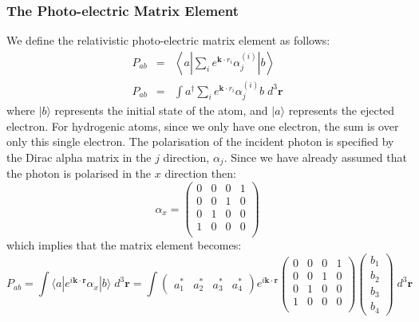 \documentclass[a4paper,titlepage]{report}
\newcommand{\mb}[1]{\mathbf{#1}}
\newcommand{\ket}[1]{|#1 \rangle}
\newcommand{\bra}[1]{\langle #1|}
\begin{document}
	\subsubsection{The Photo-electric Matrix Element}
	We define the relativistic photo-electric matrix element as follows:
	\begin{eqnarray}
		P_{ab} & = & \left\langle a \left|
						\sum_i e^{\mb{k}\cdot r_i} \alpha_j^{(i)} 
					\right| b \right\rangle \\
		P_{ab} & = & \int a^{\dagger}
						\sum_i e^{\mb{k}\cdot r_i} \alpha_j^{(i)} 
					b  \; d^3\mb{r}
	\end{eqnarray}
	where $\ket{b}$ represents the initial state of the atom, and $\ket{a}$
	represents the ejected electron. For hydrogenic atoms, since we only have
	one electron, the sum is over only this single electron. The polarisation of
	the incident photon is specified by the Dirac alpha matrix in the $j$
	direction, $\alpha_j$. Since we have already assumed that the photon is
	polarised in the $x$ direction then:
	\begin{equation*}
		\alpha_x = 
		\left(
			\begin{array}{cccc}
				0 & 0 & 0 & 1	\\
				0 & 0 & 1 & 0 	\\
				0 & 1 & 0 & 0	\\
				1 & 0 & 0 & 0 	\\
			\end{array}
		\right)
	\end{equation*}
	which implies that the matrix element becomes:
	\begin{equation*}
		P_{ab} = 
		\int
			\bra{a} e^{i\mb{k}\cdot \mb{r}} \alpha_x \ket{b}
		\; d^3 \mb{r}
		=
		\int
			\left(
				\begin{array}{cccc}
					a_1^* &	a_2^* & a_3^* & a_4^*  
				\end{array}
			\right)
			e^{i \mb{k} \cdot \mb{r}}
			\left(
				\begin{array}{cccc}
				0 & 0 & 0 & 1	\\
				0 & 0 & 1 & 0 	\\
				0 & 1 & 0 & 0	\\
				1 & 0 & 0 & 0 	\\
				\end{array}
			\right)
			\left(
				\begin{array}{c}
					b_1 \\
					b_2 \\
					b_3 \\
					b_4
				\end{array}
			\right)
		\; d^3 \mb{r}
	\end{equation*}
\end{document}
